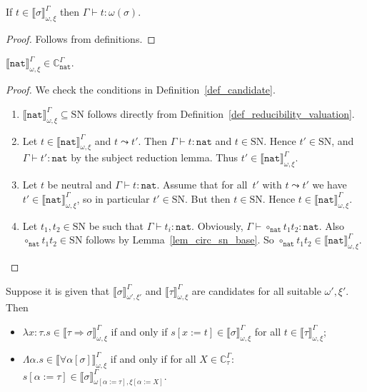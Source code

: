\documentclass[runningheads,a4paper]{llncs}
\newcommand{\quant}[2]{\forall #1[#2]}
\newcommand{\arrtype}{\Rightarrow}
\newcommand{\abs}[2]{\lambda #1.#2}
\newcommand{\tabs}[2]{\Lambda #1.#2}
\newcommand{\subst}[2]{#1:=#2}
\newcommand{\nat}{\mathtt{nat}}
\newcommand{\SN}{\mathrm{SN}}
\newcommand{\Cb}{\mathbb{C}}
\newcommand{\val}[3]{\ensuremath{\llbracket#1\rrbracket_{#2}^{#3}}}
\newcommand{\proves}{\vdash}
\begin{document}
\begin{lemma}\label{lem_val_typable}
  If $t \in \val{\sigma}{\omega,\xi}{\Gamma}$ then
  $\Gamma \proves t : \omega(\sigma)$.
\end{lemma}

\begin{proof}
  Follows from definitions.
\end{proof}

\begin{lemma}\label{lem_nat_reducible}
  $\val{\nat}{\omega,\xi}{\Gamma} \in \Cb_{\nat}^\Gamma$.
\end{lemma}

\begin{proof}
  We check the conditions in Definition~\ref{def_candidate}.
  \begin{enumerate}
  \item $\val{\nat}{\omega,\xi}{\Gamma} \subseteq \SN$ follows
    directly from Definition~\ref{def_reducibility_valuation}.
  \item Let $t \in \val{\nat}{\omega,\xi}{\Gamma}$ and
    $t \leadsto t'$. Then $\Gamma \proves t : \nat$ and $t \in
    \SN$. Hence $t' \in \SN$, and $\Gamma \proves t' : \nat$ by the
    subject reduction lemma. Thus
    $t' \in \val{\nat}{\omega,\xi}{\Gamma}$.
  \item Let $t$ be neutral and $\Gamma \proves t : \nat$. Assume that
    for all~$t'$ with $t \leadsto t'$ we have
    $t' \in \val{\nat}{\omega,\xi}{\Gamma}$, so in particular
    $t' \in \SN$. But then $t \in \SN$. Hence
    $t \in \val{\nat}{\omega,\xi}{\Gamma}$.
  \item Let $t_1,t_2 \in \SN$ be such that
    $\Gamma \proves t_i : \nat$. Obviously,
    $\Gamma \proves \circ_\nat t_1 t_2 : \nat$. Also
    $\circ_\nat t_1 t_2 \in \SN$ follows by Lemma~\ref{lem_circ_sn_base}.
    So $\circ_\nat t_1 t_2 \in \val{\nat}{\omega,\xi}{\Gamma}$.
  \end{enumerate}
\end{proof}

\begin{lemma}\label{lem_abstraction_computable}
  Suppose it is given that $\val{\sigma}{\omega',\xi'}{\Gamma}$ and
  $\val{\tau}{\omega,\xi}{\Gamma}$ are candidates for all suitable
  $\omega',\xi'$.  Then
  \begin{itemize}
  \item $\abs{x:\tau}{s} \in \val{\tau \arrtype \sigma}{\omega,\xi}{
    \Gamma}$ if and only if
    $s[x:=t] \in \val{\sigma}{\omega,\xi}{\Gamma}$ for all $t \in \val{
    \tau}{\omega,\xi}{\Gamma}$;
  \item $\tabs{\alpha}{s} \in \val{\quant{\alpha}{\sigma}}{\omega,\xi}{
    \Gamma}$ if and only if for all $X \in \Cb_\tau^\Gamma$:
    $s[\alpha:=\tau] \in
    \val{\sigma}{\omega[\subst{\alpha}{\tau}],\xi[\subst{\alpha}{X}]}{\Gamma}$.
  \end{itemize}
\end{lemma}
\end{document}
